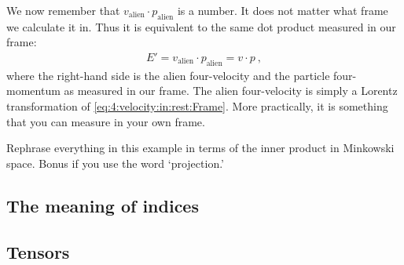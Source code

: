 \documentclass[12pt, oneside]{report}    %
\begin{document}
We now remember that $v_\text{alien}\cdot p_\text{alien}$ is a number. It does not matter what frame we calculate it in. Thus it is equivalent to the same dot product measured in our frame:
\begin{align}
E'=
    v_\text{alien}\cdot p_\text{alien} = v\cdot p \ ,
\end{align}
where the right-hand side is the alien four-velocity and the particle four-momentum as measured in our frame. The alien four-velocity is simply a Lorentz transformation of \eqref{eq:4:velocity:in:rest:Frame}. More practically, it is something that you can measure in your own frame. 


\begin{exercise}
Rephrase everything in this example in terms of the inner product in Minkowski space. Bonus if you use the word `projection.'
\end{exercise}






\subsection{The meaning of indices}


\subsection{Tensors}
\end{document}
